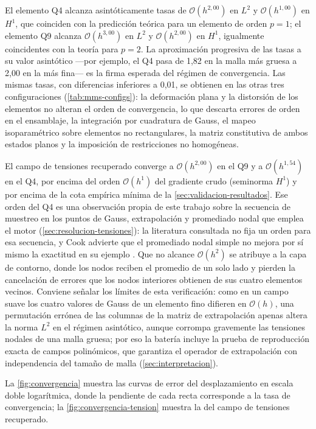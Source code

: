 El elemento Q4 alcanza asintóticamente tasas de $\mathcal{O}(h^{2{,}00})$ en $L^2$ y $\mathcal{O}(h^{1{,}00})$ en $H^1$, que coinciden con la predicción teórica para un elemento de orden $p=1$; el elemento Q9 alcanza $\mathcal{O}(h^{3{,}00})$ en $L^2$ y $\mathcal{O}(h^{2{,}00})$ en $H^1$, igualmente coincidentes con la teoría para $p=2$. La aproximación progresiva de las tasas a su valor asintótico ---por ejemplo, el Q4 pasa de 1,82 en la malla más gruesa a 2,00 en la más fina--- es la firma esperada del régimen de convergencia. Las mismas tasas, con diferencias inferiores a 0,01, se obtienen en las otras tres configuraciones (\autoref{tab:mms-configs}): la deformación plana y la distorsión de los elementos no alteran el orden de convergencia, lo que descarta errores de orden en el ensamblaje, la integración por cuadratura de Gauss, el mapeo isoparamétrico sobre elementos no rectangulares, la matriz constitutiva de ambos estados planos y la imposición de restricciones no homogéneas.

El campo de tensiones recuperado converge a $\mathcal{O}(h^{2{,}00})$ en el Q9 y a $\mathcal{O}(h^{1{,}54})$ en el Q4, por encima del orden $\mathcal{O}(h^{1})$ del gradiente crudo (seminorma $H^1$) y por encima de la cota empírica mínima de la \autoref{sec:validacion-resultados}. Ese orden del Q4 es una observación propia de este trabajo sobre la secuencia de muestreo en los puntos de Gauss, extrapolación y promediado nodal que emplea el motor (\autoref{sec:resolucion-tensiones}): la literatura consultada no fija un orden para esa secuencia, y Cook advierte que el promediado nodal simple no mejora por sí mismo la exactitud en su ejemplo \autocite[p.~231]{cook2002concepts}. Que no alcance $\mathcal{O}(h^{2})$ se atribuye a la capa de contorno, donde los nodos reciben el promedio de un solo lado y pierden la cancelación de errores que los nodos interiores obtienen de sus cuatro elementos vecinos. Conviene señalar los límites de esta verificación: como en un campo suave los cuatro valores de Gauss de un elemento fino difieren en $\mathcal{O}(h)$, una permutación errónea de las columnas de la matriz de extrapolación apenas altera la norma $L^2$ en el régimen asintótico, aunque corrompa gravemente las tensiones nodales de una malla gruesa; por eso la batería incluye la prueba de reproducción exacta de campos polinómicos, que garantiza el operador de extrapolación con independencia del tamaño de malla (\autoref{sec:interpretacion}).

La \autoref{fig:convergencia} muestra las curvas de error del desplazamiento en escala doble logarítmica, donde la pendiente de cada recta corresponde a la tasa de convergencia; la \autoref{fig:convergencia-tension} muestra la del campo de tensiones recuperado.

